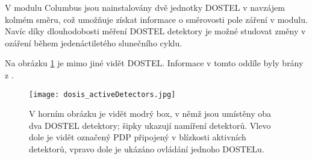 V modulu Columbus jsou nainstalovány dvě jednotky DOSTEL v navzájem kolmém směru, což umožňuje získat informace o směrovosti pole záření v modulu. Navíc díky dlouhodobosti měření DOSTEL detektory je možné studovat změny v ozáření během jedenáctiletého slunečního cyklu.

Na obrázku \ref{fig:dosis_activeDetectors} je mimo jiné vidět DOSTEL. Informace v tomto oddíle byly brány z \cite{dosis,activeDetectors}. 
\begin{figure}[H]
  \centering
  \texttt{[image: dosis\_activeDetectors.jpg]}
  \caption{V horním obrázku je vidět modrý box, v němž jsou umístěny oba dva DOSTEL detektory; šipky ukazují namíření detektorů. Vlevo dole je vidět označený PDP připojený v blízkosti aktivních detektorů, vpravo dole je ukázáno ovládání jednoho DOSTELu. \cite{dosis2}}
  \label{fig:dosis_activeDetectors}
\end{figure}




